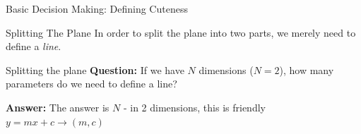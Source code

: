 \documentclass[]{SangerLibrary/sanger-present}
\begin{document}
	
	\begin{frame}{Basic Decision Making: Defining Cuteness}

		
		\begin{center}
			\def\w{8}
		\end{center}

	\end{frame}

	
	\begin{frame}{Splitting The Plane}
		In order to split the plane into two parts, we merely need to define a \textit{line}. 
		
		\begin{center}
			\end{center}
	\end{frame}

	\begin{frame}{Splitting the plane}
		\pause \textbf{Question: } If we have $N$ dimensions ($N=2$), how many parameters do we need to define a line?
		
		\vspace{2cm}
		
		\pause \textbf{Answer: } The answer is $N$ - in 2 dimensions, this is friendly $y = mx + c \to (m,c)$

	\end{frame}
\end{document}
